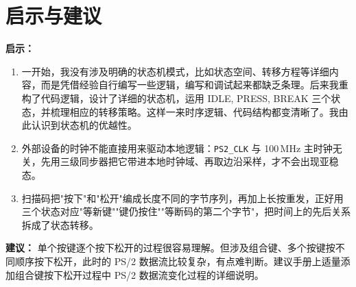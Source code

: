 \documentclass[12pt, a4paper]{ctexart}
\begin{document}
\section{启示与建议}

\textbf{启示：}
\begin{enumerate}
    \item 一开始，我没有涉及明确的状态机模式，比如状态空间、转移方程等详细内容，而是凭借经验自行编写一些逻辑，编写和调试起来都缺乏条理。后来我重构了代码逻辑，设计了详细的状态机，运用 IDLE, PRESS, BREAK 三个状态，并梳理相应的转移策略。这样一来时序逻辑、代码结构都变清晰了。我由此认识到状态机的优越性。
    \item 外部设备的时钟不能直接用来驱动本地逻辑：\texttt{PS2\_CLK} 与 100\,MHz 主时钟无关，先用三级同步器把它带进本地时钟域、再取边沿采样，才不会出现亚稳态。
    \item 扫描码把"按下"和"松开"编成长度不同的字节序列，再加上长按重发，正好用三个状态对应"等新键""键仍按住""等断码的第二个字节"，把时间上的先后关系拆成了状态转移。
\end{enumerate}

\textbf{建议：} 单个按键逐个按下松开的过程很容易理解。但涉及组合键、多个按键按不同顺序按下松开，此时的 PS/2 数据流比较复杂，有点难判断。建议手册上适量添加组合键按下松开过程中 PS/2 数据流变化过程的详细说明。
\end{document}
